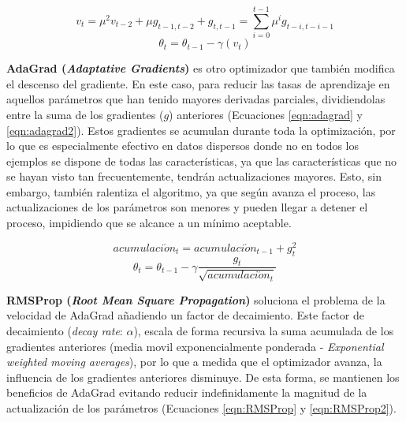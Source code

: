 \begin{equation}
\label{eqn:momento2}
v_t = \mu^2 v_{t-2} + \mu g_{t-1, t-2} + g_{t, t-1} = \sum_{i=0}^{t-1}\mu^{i}g_{t-i, t-i-1}
\end{equation}
\begin{equation}
\label{eqn:momento3}
\theta_t = \theta_{t-1} - \gamma (v_t)
\end{equation}

\textbf{AdaGrad (\textit{Adaptative Gradients})} es otro optimizador que también modifica el descenso del gradiente. En este caso, para reducir las tasas de aprendizaje en aquellos parámetros que han tenido mayores derivadas parciales, dividiendolas entre la suma de los gradientes ($g$) anteriores (Ecuaciones \ref{eqn:adagrad} y \ref{eqn:adagrad2}). Estos gradientes se acumulan durante toda la optimización, por lo que es especialmente efectivo en datos dispersos donde no en todos los ejemplos se dispone de todas las características, ya que las características que no se hayan visto tan frecuentemente, tendrán actualizaciones mayores. Esto, sin embargo, también ralentiza el algoritmo, ya que según avanza el proceso, las actualizaciones de los parámetros son menores y pueden llegar a detener el proceso, impidiendo que se alcance a un mínimo aceptable.

\begin{equation}
\label{eqn:adagrad}
acumulaci\acute{o}n_t = acumulaci\acute{o}n_{t-1} + g^{2}_{t}
\end{equation}
\begin{equation}
\label{eqn:adagrad2}
\theta_t = \theta_{t-1} - \gamma \frac{g_t}{\sqrt{acumulaci\acute{o}n_t}}
\end{equation}


\textbf{RMSProp (\textit{Root Mean Square Propagation})} soluciona el problema de la velocidad de AdaGrad añadiendo un factor de decaimiento. Este factor de decaimiento (\textit{decay rate}: $\alpha$), escala de forma recursiva la suma acumulada de los gradientes anteriores (media movil exponencialmente ponderada - \textit{Exponential weighted moving averages}), por lo que a medida que el optimizador avanza, la influencia de los gradientes anteriores disminuye. De esta forma, se mantienen los beneficios de AdaGrad evitando reducir indefinidamente la magnitud de la actualización de los parámetros (Ecuaciones \ref{eqn:RMSProp} y \ref{eqn:RMSProp2}).

